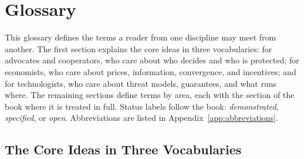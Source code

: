 \documentclass[10pt,twoside,openany]{book}
\theoremstyle{dpepstyle}
\begin{document}
\backmatter
\chapter{Glossary}
\label{app:glossary}

This glossary defines the terms a reader from one discipline may meet from another. The first section explains the core ideas in three vocabularies: for advocates and cooperators, who care about who decides and who is protected; for economists, who care about prices, information, convergence, and incentives; and for technologists, who care about threat models, guarantees, and what runs where. The remaining sections define terms by area, each with the section of the book where it is treated in full. Status labels follow the book: \emph{demonstrated}, \emph{specified}, or \emph{open}. Abbreviations are listed in Appendix~\ref{app:abbreviations}.

\section*{The Core Ideas in Three Vocabularies}
\end{document}
